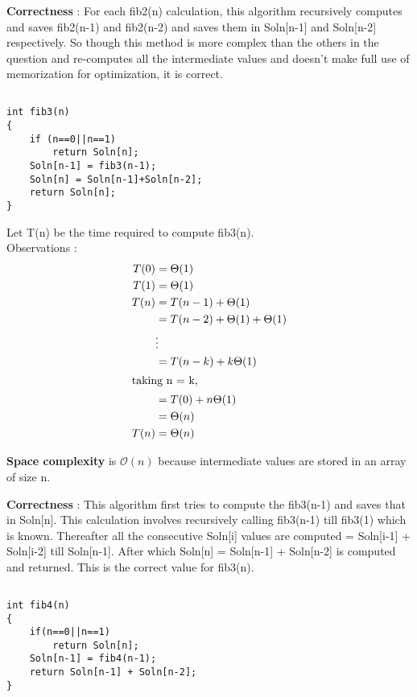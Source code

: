 \documentclass{article}
\begin{document}
\textbf{Correctness} : For each fib2(n) calculation, this algorithm recursively computes and saves fib2(n-1) and fib2(n-2) and saves them in Soln[n-1] and Soln[n-2] respectively. So though this method is more complex than the others in the question and re-computes all the intermediate values and doesn't make full use of memorization for optimization, it is correct.

\newpage
\subsection{}
\begin{lstlisting}
int fib3(n)
{
	if (n==0||n==1) 
		return Soln[n];
	Soln[n-1] = fib3(n-1);
	Soln[n] = Soln[n-1]+Soln[n-2];
	return Soln[n];
}
\end{lstlisting}

Let T(n) be the time required to compute fib3(n). \\
Observations : \\
\begin{align*}
T(0) & = \Theta(1) \\
T(1) & = \Theta(1) \\
T(n) & = T(n-1) + \Theta(1) \\
& = T(n-2) + \Theta(1) + \Theta(1) \\
& \vdots \\
& = T(n-k) + k\Theta(1) \\
\intertext{taking n = k,}
& = T(0) + n\Theta(1) \\
& = \Theta(n) \\
T(n) & = \Theta(n)\\
\end{align*}

\textbf{Space complexity} is $\mathcal{O}(n)$ because intermediate values are stored in an array of size n.

\textbf{Correctness} : This algorithm first tries to compute the fib3(n-1) and saves that in Soln[n]. This calculation involves recursively calling fib3(n-1) till fib3(1) which is known. Thereafter all the consecutive Soln[i] values are computed = Soln[i-1] + Soln[i-2] till Soln[n-1]. After which Soln[n] = Soln[n-1] + Soln[n-2] is computed and returned. This is the correct value for fib3(n).
\newpage
\subsection{}
\begin{lstlisting}
int fib4(n)
{
	if(n==0||n==1)
		return Soln[n];
	Soln[n-1] = fib4(n-1); 
	return Soln[n-1] + Soln[n-2];
}
\end{lstlisting}
\end{document}
